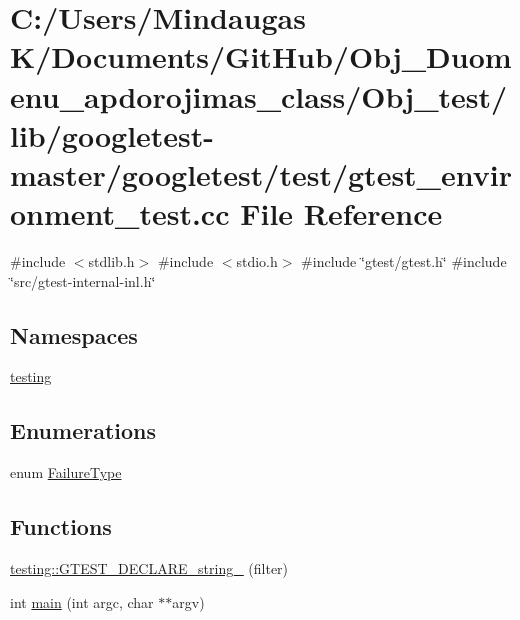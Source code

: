 \hypertarget{_obj__test_2lib_2googletest-master_2googletest_2test_2gtest__environment__test_8cc}{}\section{C\+:/\+Users/\+Mindaugas K/\+Documents/\+Git\+Hub/\+Obj\+\_\+\+Duomenu\+\_\+apdorojimas\+\_\+class/\+Obj\+\_\+test/lib/googletest-\/master/googletest/test/gtest\+\_\+environment\+\_\+test.cc File Reference}
\label{_obj__test_2lib_2googletest-master_2googletest_2test_2gtest__environment__test_8cc}
{\ttfamily \#include $<$stdlib.\+h$>$}\newline
{\ttfamily \#include $<$stdio.\+h$>$}\newline
{\ttfamily \#include \char`\"{}gtest/gtest.\+h\char`\"{}}\newline
{\ttfamily \#include \char`\"{}src/gtest-\/internal-\/inl.\+h\char`\"{}}\newline
\subsection*{Namespaces}
\begin{DoxyCompactItemize}
\item 
 \mbox{\hyperlink{namespacetesting}{testing}}
\end{DoxyCompactItemize}
\subsection*{Enumerations}
\begin{DoxyCompactItemize}
\item 
enum \mbox{\hyperlink{_obj__test_2lib_2googletest-master_2googletest_2test_2gtest__environment__test_8cc_aa43ad7e2c1c5c5150ba8d95607a96263}{Failure\+Type}} 
\end{DoxyCompactItemize}
\subsection*{Functions}
\begin{DoxyCompactItemize}
\item 
\mbox{\hyperlink{namespacetesting_a20d69860ce843142c7f740262e6b0c9a}{testing\+::\+G\+T\+E\+S\+T\+\_\+\+D\+E\+C\+L\+A\+R\+E\+\_\+string\+\_\+}} (filter)
\item 
int \mbox{\hyperlink{_obj__test_2lib_2googletest-master_2googletest_2test_2gtest__environment__test_8cc_a3c04138a5bfe5d72780bb7e82a18e627}{main}} (int argc, char $\ast$$\ast$argv)
\end{DoxyCompactItemize}


